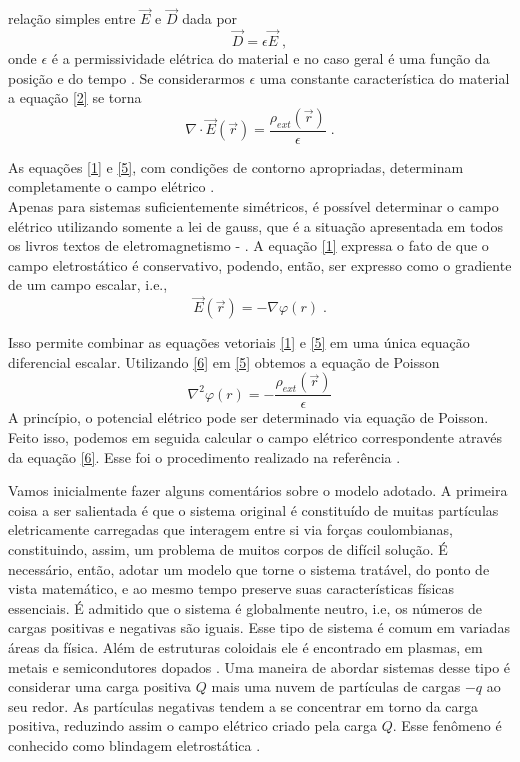 \documentclass[brazilian,10.7pt,a4paper]{article}
\begin{document}
\begin{multicols}{2}
relação simples entre $\vec{E}$ e $\vec{D}$ dada por
\\
\begin{equation}\label{4}
\vec{D} = \epsilon\vec{E}\;,
\end{equation}
onde $\epsilon$ é a permissividade elétrica do material e no caso geral é uma função da posição e do tempo \cite{andrade}. Se considerarmos $\epsilon$ uma constante característica do material a equação \eqref{2} se torna
\\
\begin{equation}\label{5}
\nabla\cdot\vec{E}(\vec{r})=\frac{\rho_{ext}(\vec{r})}{\epsilon}\;.
\end{equation}
\par As equações \eqref{1} e \eqref{5}, com condições de contorno apropriadas, determinam completamente o campo elétrico \cite{tort}.\\
Apenas para sistemas suficientemente simétricos, é possível determinar o campo elétrico utilizando somente a lei de gauss, que é a situação apresentada em todos os livros textos de eletromagnetismo \cite{hm} - \cite{jackson}. A equação \eqref{1} expressa o fato de que o campo eletrostático é conservativo, podendo, então, ser expresso como o gradiente de um campo escalar, i.e., %
\\
\begin{equation}\label{6}
\vec{E}(\vec{r})= -\nabla\varphi(r)\;.
\end{equation}
\par Isso permite combinar as equações vetoriais \eqref{1} e \eqref{5} em uma única equação diferencial escalar. Utilizando \eqref{6} em \eqref{5} obtemos a equação de Poisson
\\
\begin{equation}\label{7}
\nabla^{2}\varphi(r)=-\frac{\rho_{ext}(\vec{r})}{\epsilon}
\end{equation}
A princípio, o potencial elétrico pode ser determinado via equação de Poisson. Feito isso, podemos em seguida calcular o campo elétrico correspondente através da equação \eqref{6}. Esse foi o procedimento realizado na referência \cite{ramos}.
\par Vamos inicialmente fazer alguns comentários sobre o modelo adotado. A primeira coisa a ser salientada é que o sistema original é constituído de muitas partículas eletricamente carregadas que interagem entre si via forças coulombianas, constituindo, assim, um problema de muitos corpos de difícil solução. É necessário, então, adotar um modelo que torne o sistema tratável, do ponto de vista matemático, e ao mesmo tempo preserve suas características físicas essenciais. É admitido que o sistema é globalmente neutro, i.e, os números de cargas positivas e negativas são iguais. Esse tipo de sistema é comum em variadas áreas da física. Além de estruturas coloidais ele é encontrado em plasmas, em metais e semicondutores dopados \cite{platzman}. Uma maneira de abordar sistemas desse tipo é considerar uma carga positiva $Q$ mais uma nuvem de partículas de cargas $-q$ ao seu redor. As partículas negativas tendem a se concentrar em torno da carga positiva, reduzindo assim o campo elétrico criado pela carga $Q$. Esse fenômeno é conhecido como blindagem eletrostática \cite{kittel}.

\end{multicols}
\end{document}
